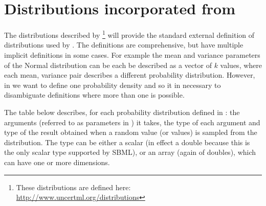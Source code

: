 \documentclass[draftspec]{sbmlpkgspec}
\begin{document}
\appendix
\section{Distributions incorporated from \uncertml}

The distributions described by \uncertml \footnote{These
  distributions are defined here:
  \url{http://www.uncertml.org/distributions}} will provide the
standard external definition of distributions used by \distrib. The
definitions are comprehensive, but have multiple implicit definitions
in some cases. For example the mean and variance parameters of the
Normal distribution can be each be described as a vector of $k$
values, where each mean, variance pair describes a different
probability distribution. However, in \distribshort we want to define
one probability density and so it in necessary to disambiguate
definitions where more than one is possible.

The table below describes, for each probability distribution defined in
\uncertml: the arguments (referred to as parameters in \uncertml) it
takes, the type of each argument and type of the result obtained when
a random value (or values) is sampled from the distribution. The type
can be either a scalar (in effect a double because this is the only
scalar type supported by SBML), or an array (again of doubles), which
can have one or more dimensions.
\end{document}
